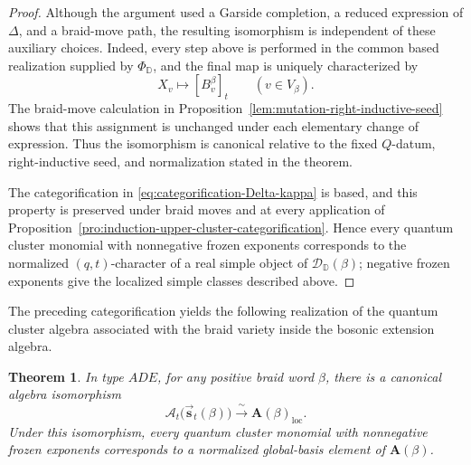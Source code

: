 \documentclass[12pt, reqno]{amsart}
\theoremstyle{plain}
\newtheorem{theorem}{Theorem}[section]
\theoremstyle{definition}
\numberwithin{equation}{section}
\newcommand{\DD}{\mathbb{D}}
\begin{document}
\begin{proof}
Although the argument used a Garside completion, a reduced expression
of \(\Delta\), and a braid-move path, the resulting isomorphism is
independent of these auxiliary choices. Indeed, every step above is
performed in the common based realization supplied by
\(\Phi_{\DD}\), and the final map is uniquely characterized by
\[
    X_v
    \longmapsto
    [B_v^\beta]_t
    \qquad(v\in V_\beta).
\]
The braid-move calculation in
Proposition~\ref{lem:mutation-right-inductive-seed} shows that this
assignment is unchanged under each elementary change of expression.
Thus the isomorphism is canonical relative to the fixed \(Q\)-datum,
right-inductive seed, and normalization stated in the theorem.

The categorification in
\eqref{eq:categorification-Delta-kappa} is based, and this property
is preserved under braid moves and at every application of
Proposition~\ref{pro:induction-upper-cluster-categorification}.
Hence every quantum cluster monomial with nonnegative frozen exponents
corresponds to the normalized \((q,t)\)-character of a real simple object
of \(\mathscr D_{\DD}(\beta)\); negative frozen exponents give the
localized simple classes described above.
\end{proof}

The preceding categorification yields the following realization of
the quantum cluster algebra associated with the braid variety inside
the bosonic extension algebra.

\begin{theorem}\label{thm:quantization-braid-variety}
In type \(ADE\), for any positive braid word $\beta$, there is a canonical algebra isomorphism
\begin{equation}\label{eq:braid-variety-quantization}
    \mathcal A_t\bigl(\overrightarrow{\mathbf s}_t(\beta)\bigr)
    \xrightarrow{\ \sim\ }
    \mathbf A(\beta)_{\mathrm{loc}}.
\end{equation}
Under this isomorphism, every quantum cluster monomial with nonnegative
frozen exponents corresponds to a normalized global-basis element of
\(\mathbf A(\beta)\).
\end{theorem}
\end{document}
